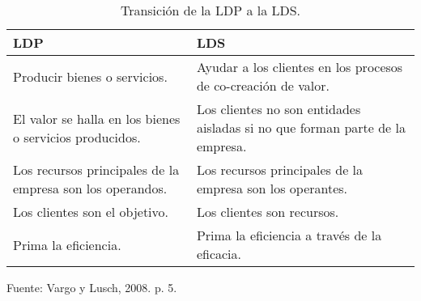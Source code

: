 \begin{table}[h]
    \caption {Transición de la LDP a la LDS.}
	\label{tab:transicion}
	\setlength\extrarowheight{5pt}
	
	\begin{tabular}{p{7cm} p{7.5cm}}
	\toprule
	LDP                                                      & LDS                                                                          \\ \midrule
	Producir bienes o servicios.                             & Ayudar a los clientes en los procesos de co-creación de valor.               \\
	El valor se halla en los bienes o servicios producidos.  & Los clientes no son entidades aisladas si no que forman parte de la empresa. \\
	Los recursos principales de la empresa son los operandos. & Los recursos principales de la empresa son los operantes.                    \\
	Los clientes son el objetivo.                            & Los clientes son recursos.                                                   \\
	Prima la eficiencia.                                     & Prima la eficiencia a través de la eficacia.                                 \\ \bottomrule
	\end{tabular}

	\center
	\footnotesize
	Fuente: Vargo y Lusch, 2008. p. 5.
\end{table}
